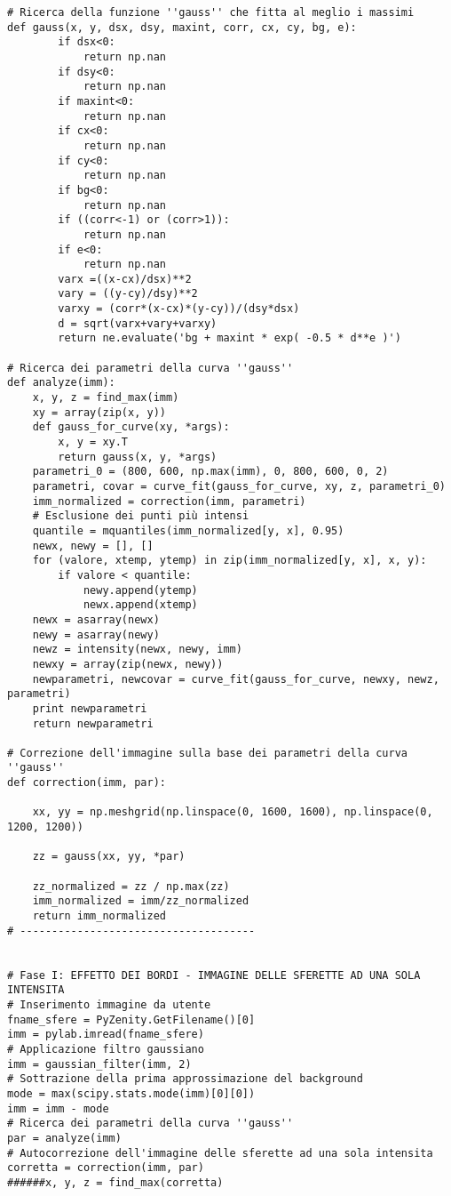 \begin{lstlisting}
# Ricerca della funzione ''gauss'' che fitta al meglio i massimi
def gauss(x, y, dsx, dsy, maxint, corr, cx, cy, bg, e):
        if dsx<0:
            return np.nan
        if dsy<0:
            return np.nan
        if maxint<0:
            return np.nan
        if cx<0:
            return np.nan
        if cy<0:
            return np.nan
        if bg<0: 
            return np.nan
        if ((corr<-1) or (corr>1)):
            return np.nan
        if e<0:
            return np.nan
        varx =((x-cx)/dsx)**2
        vary = ((y-cy)/dsy)**2
        varxy = (corr*(x-cx)*(y-cy))/(dsy*dsx)
        d = sqrt(varx+vary+varxy)
        return ne.evaluate('bg + maxint * exp( -0.5 * d**e )')
        
# Ricerca dei parametri della curva ''gauss''
def analyze(imm):
    x, y, z = find_max(imm)
    xy = array(zip(x, y))
    def gauss_for_curve(xy, *args):
        x, y = xy.T
        return gauss(x, y, *args)
    parametri_0 = (800, 600, np.max(imm), 0, 800, 600, 0, 2)
    parametri, covar = curve_fit(gauss_for_curve, xy, z, parametri_0)
    imm_normalized = correction(imm, parametri)
    # Esclusione dei punti più intensi
    quantile = mquantiles(imm_normalized[y, x], 0.95)
    newx, newy = [], []
    for (valore, xtemp, ytemp) in zip(imm_normalized[y, x], x, y):
        if valore < quantile:
            newy.append(ytemp) 
            newx.append(xtemp)
    newx = asarray(newx) 
    newy = asarray(newy)
    newz = intensity(newx, newy, imm)
    newxy = array(zip(newx, newy))
    newparametri, newcovar = curve_fit(gauss_for_curve, newxy, newz, parametri)
    print newparametri
    return newparametri

# Correzione dell'immagine sulla base dei parametri della curva ''gauss''
def correction(imm, par):

    xx, yy = np.meshgrid(np.linspace(0, 1600, 1600), np.linspace(0, 1200, 1200))
    
    zz = gauss(xx, yy, *par)
    
    zz_normalized = zz / np.max(zz)
    imm_normalized = imm/zz_normalized
    return imm_normalized 
# -------------------------------------


# Fase I: EFFETTO DEI BORDI - IMMAGINE DELLE SFERETTE AD UNA SOLA INTENSITA
# Inserimento immagine da utente
fname_sfere = PyZenity.GetFilename()[0]
imm = pylab.imread(fname_sfere)
# Applicazione filtro gaussiano
imm = gaussian_filter(imm, 2)
# Sottrazione della prima approssimazione del background
mode = max(scipy.stats.mode(imm)[0][0])
imm = imm - mode
# Ricerca dei parametri della curva ''gauss''
par = analyze(imm)
# Autocorrezione dell'immagine delle sferette ad una sola intensita
corretta = correction(imm, par)
######x, y, z = find_max(corretta)



\end{lstlisting}

